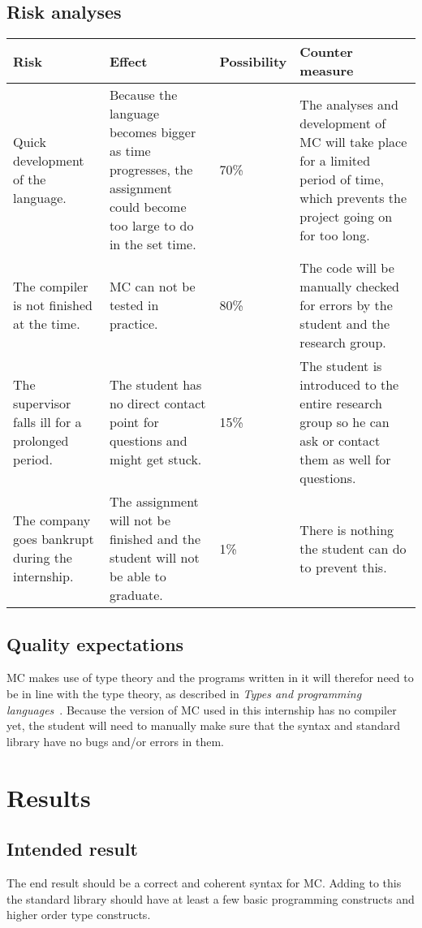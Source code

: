 \subsection{Risk analyses}
\begin{center}
   \begin{tabular}
      {| p{} | p{} | l | p{} |}
      \hline
      \textbf{Risk} & \textbf{Effect} & \textbf{Possibility} & \textbf{Counter measure}
      \\ \hline
      Quick development of the language. & Because the language becomes bigger as time progresses, the assignment could become too large to do in the set time. & 70\% & The analyses and development of MC will take place for a limited period of time, which prevents the project going on for too long.
      \\ \hline
      The compiler is not finished at the time. & MC can not be tested in practice. & 80\% & The code will be manually checked for errors by the student and the research group.
      \\ \hline
      The supervisor falls ill for a prolonged period. & The student has no direct contact point for questions and might get stuck. & 15\% & The student is introduced to the entire research group so he can ask or contact them as well for questions.
      \\ \hline
      The company goes bankrupt during the internship. & The assignment will not be finished and the student will not be able to graduate. & 1\% & There is nothing the student can do to prevent this.
      \\ \hline
   \end{tabular}
\end{center}

\subsection{Quality expectations}
MC makes use of type theory and the programs written in it will therefor need to be in line with the type theory, as described in \emph{Types and programming languages}~\cite{pierce2002types}.
Because the version of MC used in this internship has no compiler yet, the student will need to manually make sure that the syntax and standard library have no bugs and/or errors in them.

\section{Results}
\subsection{Intended result}
The end result should be a correct and coherent syntax for MC.
Adding to this the standard library should have at least a few basic programming constructs and higher order type constructs.





\begin{appendices}
   
\end{appendices}

